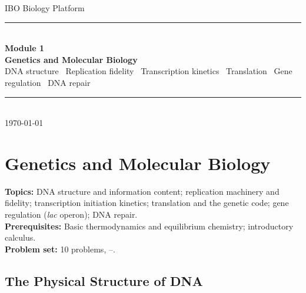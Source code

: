 \documentclass[12pt, a4paper, oneside]{report}
\begin{document}
\begin{titlepage}
  \centering
  \vspace*{4cm}
  {\sffamily\fontsize{13}{16}\selectfont\color{accent} IBO Biology Platform}\\[0.6em]
  {\rule{0.4\textwidth}{0.4pt}}\\[0.6em]
  {\sffamily\fontsize{22}{28}\selectfont\bfseries Module 1}\\[0.4em]
  {\sffamily\fontsize{16}{20}\selectfont\bfseries\color{accent} Genetics and Molecular Biology}\\[1.2em]
  {\small\color{gray}
    DNA structure \textbullet\ Replication fidelity \textbullet\
    Transcription kinetics \textbullet\ Translation \textbullet\
    Gene regulation \textbullet\ DNA repair}\\[0.6em]
  {\rule{0.4\textwidth}{0.4pt}}\\[0.5em]
  {\small\color{gray} \today}
\end{titlepage}

\tableofcontents
\newpage


\chapter{Genetics and Molecular Biology}
\label{ch:genetics}

\begin{tcolorbox}[colback=probback, colframe=accent, boxrule=0.5pt, arc=1pt,
  fonttitle=\bfseries\sffamily\small, coltitle=white, colbacktitle=accent,
  title={Module Overview}, top=4pt, bottom=4pt, left=6pt, right=6pt]
  \textbf{Topics:} DNA structure and information content;
  replication machinery and fidelity;
  transcription initiation kinetics;
  translation and the genetic code;
  gene regulation (\textit{lac} operon);
  DNA repair.\\[3pt]
  \textbf{Prerequisites:} Basic thermodynamics and equilibrium chemistry;
  introductory calculus.\\[3pt]
  \textbf{Problem set:} 10 problems, \stars{2}--\stars{5}.
\end{tcolorbox}

\section{The Physical Structure of DNA}
\end{document}
